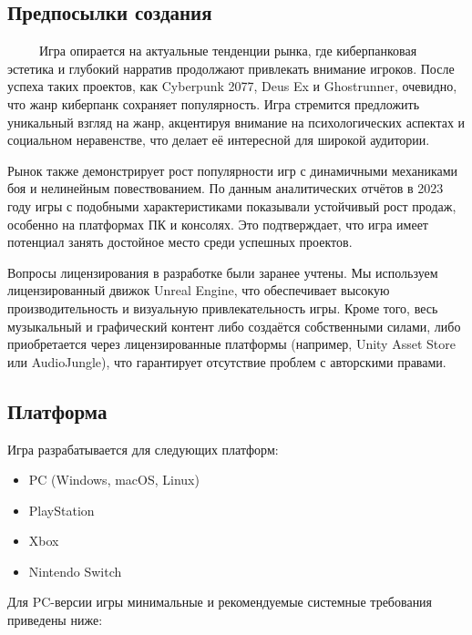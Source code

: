 \documentclass{article}
\begin{document}
\subsection{Предпосылки создания}
\ \ \ \ \ Игра опирается на актуальные тенденции рынка, где киберпанковая эстетика и глубокий нарратив продолжают привлекать внимание игроков. 
После успеха таких проектов, как Cyberpunk 2077, Deus Ex и Ghostrunner, очевидно, что жанр киберпанк сохраняет популярность.
Игра стремится предложить уникальный взгляд на жанр, акцентируя внимание на психологических аспектах и социальном неравенстве, 
что делает её интересной для широкой аудитории.

Рынок также демонстрирует рост популярности игр с динамичными механиками боя и нелинейным повествованием. По данным аналитических отчётов 
в 2023 году игры с подобными характеристиками показывали устойчивый рост продаж, особенно на платформах ПК и консолях. Это подтверждает, 
что игра имеет потенциал занять достойное место среди успешных проектов.

Вопросы лицензирования в разработке были заранее учтены. Мы используем лицензированный движок Unreal Engine, что обеспечивает 
высокую производительность и визуальную привлекательность игры. Кроме того, весь музыкальный и графический контент либо создаётся 
собственными силами, либо приобретается через лицензированные платформы (например, Unity Asset Store или AudioJungle), что гарантирует 
отсутствие проблем с авторскими правами.

\subsection{Платформа}

Игра разрабатывается для следующих платформ:
\begin{itemize}
    \item PC (Windows, macOS, Linux)
    \item PlayStation
    \item Xbox
    \item Nintendo Switch
\end{itemize}

Для PC-версии игры минимальные и рекомендуемые системные требования приведены ниже:
\end{document}
